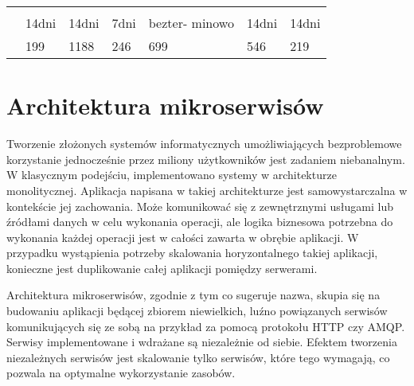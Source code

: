 \begin{minipage}{\textwidth}
\begin{table}[H]
\begin{tabular}{|P{.22\textwidth}|P{.09\textwidth}|P{.09\textwidth}|P{.09\textwidth}|P{.09\textwidth}|P{.09\textwidth}|P{.09\textwidth}|}
                  &        &            &           &             &        &      \\ \hline
                   &        &            &           &             &        &      \\ \hline
                           & 14dni     & 14dni         & 7dni         & bezter- minowo & 14dni     & 14dni   \\ \hline
                      & 199       & 1188          & 246          & 699            & 546       & 219     \\ \hline
        \end{tabular}
    \end{table}
\end{minipage}

\section{Architektura mikroserwisów}\label{sec:usefull-technologies}

Tworzenie złożonych systemów informatycznych umożliwiających bezproblemowe korzystanie jednocześnie przez miliony użytkowników jest zadaniem niebanalnym.
W klasycznym podejściu, implementowano systemy w architekturze monolitycznej.
Aplikacja napisana w takiej architekturze jest samowystarczalna w kontekście jej zachowania.
Może komunikować się z zewnętrznymi usługami lub źródłami danych w celu wykonania operacji, ale logika biznesowa potrzebna do wykonania każdej operacji jest w całości zawarta w obrębie aplikacji.
W przypadku wystąpienia potrzeby skalowania horyzontalnego takiej aplikacji, konieczne jest duplikowanie całej aplikacji pomiędzy serwerami\cite{url:microsoft-web-architectures}.

\par
Architektura mikroserwisów, zgodnie z tym co sugeruje nazwa, skupia się na budowaniu aplikacji będącej zbiorem niewielkich, luźno powiązanych serwisów komunikujących się ze sobą na przykład za pomocą protokołu HTTP czy AMQP.
Serwisy implementowane i wdrażane są niezależnie od siebie\cite{book:dot-net-microservices}.
Efektem tworzenia niezależnych serwisów jest skalowanie tylko serwisów, które tego wymagają, co pozwala na optymalne wykorzystanie zasobów\cite{book:mastering-microservices-with-java9}.

